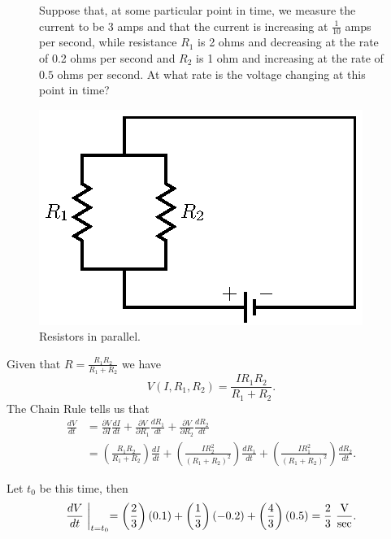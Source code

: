 \begin{exercises}
\begin{figure}[ht]
\begin{minipage}{4in}
    \item Suppose that, at some particular point in time, we measure the current to be 3 amps and that the current is increasing at $\frac{1}{10}$ amps per second, while resistance $R_1$ is 2 ohms and decreasing at the rate of 0.2 ohms per second and $R_2$ is 1 ohm and increasing at the rate of $0.5$ ohms per second. At what rate is the voltage changing at this point in time?



    \ea
\end{minipage} \hspace{0.2in}
\begin{minipage}{2.3in}
\begin{center}
 \includegraphics{figures/fig_10_5_resistors.eps}
\end{center}
\caption{Resistors in parallel.}
\label{F:10.5.CR_Circuit}
\end{minipage}
\end{figure}

\begin{exerciseSolution}
        \ba
    \item Given that $R = \frac{R_1R_2}{R_1+R_2}$ we have 
\[V(I,R_1,R_2) = \frac{IR_1R_2}{R_1+R_2}.\]
The Chain Rule tells us that 
\begin{align*}
\frac{dV}{dt} &= \frac{\partial V}{\partial I} \frac{dI}{dt} + \frac{\partial V}{\partial R_1} \frac{dR_1}{dt} + \frac{\partial V}{\partial R_2} \frac{dR_2}{dt} \\
	&=  \left(\frac{R_1R_2}{R_1+R_2}\right)\frac{dI}{dt} + \left(\frac{IR_2^2}{(R_1+R_2)^2}\right) \frac{dR_1}{dt} +  \left(\frac{IR_1^2}{(R_1+R_2)^2}\right) \frac{dR_2}{dt}.
\end{align*}


    \item Let $t_0$ be this time, then 
\[\frac{dV}{dt}\biggm|_{t=t_0} = \left(\frac{2}{3}\right)(0.1) + \left(\frac{1}{3}\right)(-0.2) + \left(\frac{4}{3}\right)(0.5) = \frac{2}{3} \ \frac{\text{V}}{\text{sec}}.\]




    \ea
\end{exerciseSolution}

\end{exercises}
\afterexercises
